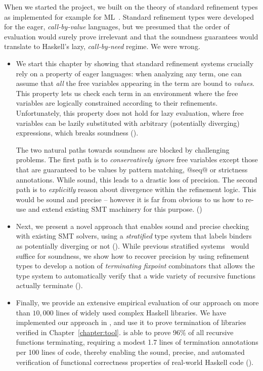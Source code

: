 When we started the \toolname project, 
we built on the theory of standard refinement types 
as implemented for example for ML~\cite{pfenningxi98,GordonTOPLAS2011,LiquidPLDI08}.
%
Standard refinement types were developed for the eager, 
\emph{call-by-value} languages, but we presumed that
the order of evaluation would surely prove irrelevant
and that the soundness guarantees would translate 
to Haskell's lazy, \emph{call-by-need} regime.
%
We were wrong.

\begin{itemize}
\item We start this chapter by showing that standard refinement 
systems crucially rely on a property of eager languages:
%
when analyzing any term, one can assume that \emph{all} the
free variables appearing in the term are bound to \emph{values}.
This property lets us check each term in an environment where 
the free variables are logically constrained according to 
their refinements.
%
Unfortunately, this property does not hold for lazy evaluation, 
where free variables can be lazily substituted with arbitrary 
(potentially diverging) expressions, which breaks 
soundness ().

The two natural paths towards soundness are blocked by challenging problems.
%
The first path is to \emph{conservatively ignore} free variables 
except those that are guaranteed to be values \eg by pattern 
matching, @seq@ or strictness annotations.  
While sound, this leads to a drastic loss of precision. 
%
The second path is to \emph{explicitly} reason about divergence 
within the refinement logic. This would be sound and 
precise -- however it is far from obvious to us how 
to re-use and extend existing SMT machinery for 
this purpose. ()

\item Next, we present a novel approach that
enables sound and precise checking with existing 
SMT solvers, using a \emph{stratified} type system that 
labels binders as potentially diverging or not 
().
%
While previous stratified systems~\cite{ConstableS87}
would suffice for soundness, we show how to recover 
precision by using refinement types to develop a 
notion of \emph{terminating fixpoint} combinators 
that allows the type system to automatically 
verify that a wide variety of recursive functions 
actually terminate ().

\item Finally, we provide an extensive empirical
evaluation of our approach on more than $10,000$ 
lines of widely used complex Haskell libraries.
We have implemented our approach in \toolname, 
and use it to prove termination of 
libraries verified in Chapter~\ref{chapter:tool}.
%
\toolname is able to prove 96\% of 
all recursive functions terminating, requiring a modest 
1.7 lines of termination annotations per 100 lines 
of code, thereby enabling the sound, precise, 
and automated verification of functional 
correctness properties of real-world Haskell code 
().
\end{itemize}

